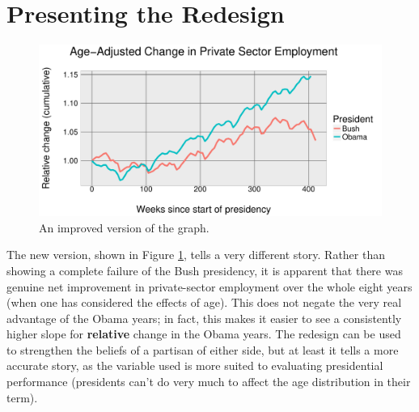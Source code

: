 \documentclass[12pt]{amsart}
\begin{document}
\section*{Presenting the Redesign}
\begin{figure}[!htbp]
\begin{center}
\includegraphics[width=\textwidth]{Main_plot.pdf}
\caption{An improved version of the graph.}
\label{improved}
\end{center}
\end{figure}

The new version, shown in Figure \ref{improved}, tells a very different story. Rather than showing a complete failure of the Bush presidency, it is apparent that there was genuine net improvement in private-sector employment over the whole eight years (when one has considered the effects of age). This does not negate the very real advantage of the Obama years; in fact, this makes it easier to see a consistently higher slope for \textbf{relative} change in the Obama years. The redesign can be used to strengthen the beliefs of a partisan of either side, but at least it tells a more accurate story, as the variable used is more suited to evaluating presidential performance (presidents can't do very much to affect the age distribution in their term). 
\end{document}
